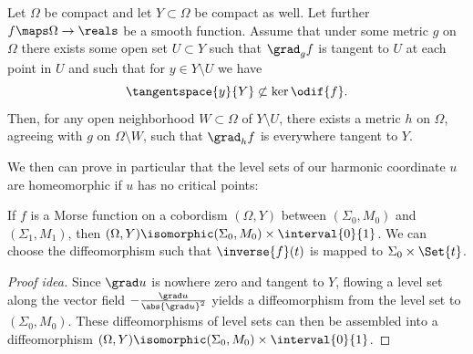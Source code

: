 \documentclass[titlepage,numbers=noenddot,oneside,%
cleardoublepage=empty,paper=a4,fontsize=11pt,%
english,%
]{scrartcl}
\begin{document}
\begin{lemma}\label{lem:realize_harmonic_function_as_morse_function}
    Let \( \Omega \) be compact and let \( Y\subset \Omega \) be compact as well. Let further \( f\maps \Omega\to \reals \) be a smooth function. Assume that under some metric \( g \) on \( \Omega \) there exists some open set \( U\subset Y \) such that \( \grad_g f \) is tangent to \( U \) at each point in \( U \) and such that for \( y\in Y\setminus U \) we have 
    \begin{equation*}
        \tangentspace{y}{Y}\not\subset \ker\odif{f}.
    \end{equation*}
    Then, for any open neighborhood \( W\subset \Omega \) of \( Y\setminus U \), there exists a metric \( h \) on \( \Omega \), agreeing with \( g \) on \( \Omega\setminus W \), such that \( \grad_h f \) is everywhere tangent to \( Y \).
\end{lemma}
We then can prove in particular that the level sets of our harmonic coordinate \( u \) are homeomorphic if \( u \) has no critical points: 
\begin{lemma}\label{lem:morse_function_without_critical_points_level_sets_diffeo}
    If \( f \) is a Morse function on a cobordism \( (\Omega,Y) \) between \( (\Sigma_0,M_0) \) and \( (\Sigma_1,M_1) \), then \( (\Omega,Y)\isomorphic (\Sigma_0,M_0)\times \interval{0}{1} \). We can choose the diffeomorphism such that \( \inverse{f}(t) \) is mapped to \( \Sigma_0\times \Set{t} \).
\end{lemma}
\begin{proof}[Proof idea]
    Since \( \grad u \) is nowhere zero and tangent to \( Y \), flowing a level set along the vector field \( -\frac{\grad u}{\abs{\grad u}^2} \) yields a diffeomorphism from the level set to \( (\Sigma_0,M_0) \). These diffeomorphisms of level sets can then be assembled into a diffeomorphism \( (\Omega,Y)\isomorphic (\Sigma_0,M_0)\times \interval{0}{1}  \).
\end{proof}
% 
\end{document}
